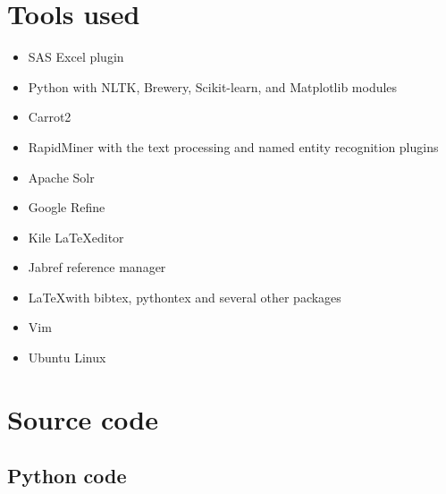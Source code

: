 \glsaddall	
\printglossaries


\appendix


\chapter{Tools used}
\begin{itemize}
 \item SAS Excel plugin
 \item Python with NLTK, Brewery, Scikit-learn, and Matplotlib modules
 \item Carrot2
 \item RapidMiner with the text processing and named entity recognition plugins
 \item Apache Solr
 \item Google Refine
 \item Kile \LaTeX editor
 \item Jabref reference manager
 \item \LaTeX with bibtex, pythontex and several other packages
 \item Vim
 \item Ubuntu Linux
\end{itemize}






\chapter{Source code}

\section{Python code}
\label{pythoncode}

